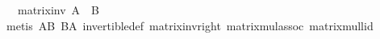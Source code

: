 \begin{isabellebody}
\ \ \ {\isachardoublequoteopen}matrix{\isacharunderscore}{\kern0pt}inv\ A\ {\isacharequal}{\kern0pt}\ B{\isachardoublequoteclose}\isanewline
%
\isadelimproof
\ \ %
\endisadelimproof
%
\isatagproof
{}\isamarkupfalse%
\ {\isacharparenleft}{\kern0pt}metis\ AB\ BA\ invertible{\isacharunderscore}{\kern0pt}def\ matrix{\isacharunderscore}{\kern0pt}inv{\isacharunderscore}{\kern0pt}right\ matrix{\isacharunderscore}{\kern0pt}mul{\isacharunderscore}{\kern0pt}assoc\ matrix{\isacharunderscore}{\kern0pt}mul{\isacharunderscore}{\kern0pt}lid{\isacharparenright}{\kern0pt}%
\endisatagproof
{\isafoldproof}%
%
\isadelimproof
\ \isanewline
%
\endisadelimproof
%
\isadelimtheory
\isanewline
%
\endisadelimtheory
%
\isatagtheory
{}\isamarkupfalse%
%
\endisatagtheory
{\isafoldtheory}%
%
\isadelimtheory
%
\endisadelimtheory
%
\end{isabellebody}%
\endinput
